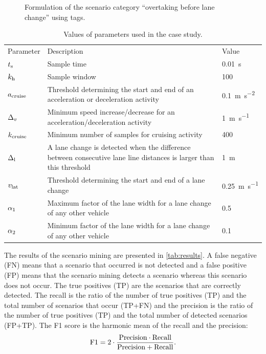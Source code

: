 \begin{figure}
	\centering
	
	\caption{\cstartd Formulation of the scenario category ``overtaking before lane change'' using tags.\cendd}
	\label{fig:overtaking template}
\end{figure}

\begin{table}
	\centering
	\caption{\cstartc Values of parameters used in the case study. \cendc}
	\label{tab:parameters}
	\cstartc
	\begin{tabularx}{\linewidth}{lXl}
		\toprule
		Parameter & Description & Value \\ \otoprule
		$t_\mathrm{s}$ & Sample time & \SI{0.01}{\second} \\
		$k_{\mathrm{h}}$ & Sample window & 100 \\
		$a_\mathrm{cruise}$ & Threshold determining the start and end of an acceleration or deceleration activity & \SI{0.1}{\meter\per\second\squared} \\
		$\Delta_{v}$ & Minimum speed increase/decrease for an acceleration/deceleration activity & \SI{1}{\meter\per\second} \\
		$k_\mathrm{cruise}$ & Minimum number of samples for cruising activity & 400 \\
		$\Delta_{\mathrm{l}}$ & A lane change is detected when the difference between consecutive lane line distances is larger than this threshold & \SI{1}{\meter} \\
		$v_{\mathrm{lat}}$ & Threshold determining the start and end of a lane change & \SI{0.25}{\meter\per\second} \\
		$\alpha_1$ & Maximum factor of the lane width for a lane change of any other vehicle & 0.5 \\
		$\alpha_2$ & Minimum factor of the lane width for a lane change of any other vehicle & 0.1 \\
		\bottomrule
	\end{tabularx}
	\cendc
\end{table}

\cstartd The results of the scenario mining are presented in \cref{tab:results}.
A false negative (FN) means that a scenario that occurred is not detected and a false positive (FP) means that the scenario mining detects a scenario whereas this scenario does not occur.
The true positives (TP) are the scenarios that are correctly detected.
The recall is the ratio of the number of true positives (TP) and the total number of scenarios that occur (TP+FN) and the precision is the ratio of the number of true positives (TP) and the total number of detected scenarios (FP+TP).
The F1 score is the harmonic mean of the recall and the precision: \cendd
\cstartf \begin{equation}
	\mathrm{F1} = 2 \cdot \frac{\mathrm{Precision}\cdot\mathrm{Recall}}{\mathrm{Precision}+\mathrm{Recall}}.
\end{equation} \cendf

